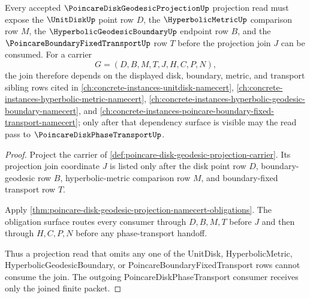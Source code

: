 \begin{theorem}
\label{thm:poincare-disk-geodesic-projection-hyperbolic-dependency}
Every accepted $\PoincareDiskGeodesicProjectionUp$ projection read must expose the $\UnitDiskUp$ point row $D$, the $\HyperbolicMetricUp$ comparison row $M$, the $\HyperbolicGeodesicBoundaryUp$ endpoint row $B$, and the $\PoincareBoundaryFixedTransportUp$ row $T$ before the projection join $J$ can be consumed. For a carrier
$$
G=(D,B,M,T,J,H,C,P,N),
$$
the join therefore depends on the displayed disk, boundary, metric, and transport sibling rows cited in \autoref{ch:concrete-instances-unitdisk-namecert}, \autoref{ch:concrete-instances-hyperbolic-metric-namecert}, \autoref{ch:concrete-instances-hyperbolic-geodesic-boundary-namecert}, and \autoref{ch:concrete-instances-poincare-boundary-fixed-transport-namecert}; only after that dependency surface is visible may the read pass to $\PoincareDiskPhaseTransportUp$.
\end{theorem}
\begin{proof}
Project the carrier of \autoref{def:poincare-disk-geodesic-projection-carrier}. Its projection join coordinate $J$ is listed only after the disk point row $D$, boundary-geodesic row $B$, hyperbolic-metric comparison row $M$, and boundary-fixed transport row $T$.

Apply \autoref{thm:poincare-disk-geodesic-projection-namecert-obligations}. The obligation surface routes every consumer through $D,B,M,T$ before $J$ and then through $H,C,P,N$ before any phase-transport handoff.

Thus a projection read that omits any one of the UnitDisk, HyperbolicMetric, HyperbolicGeodesicBoundary, or PoincareBoundaryFixedTransport rows cannot consume the join. The outgoing PoincareDiskPhaseTransport consumer receives only the joined finite packet.
\end{proof}



